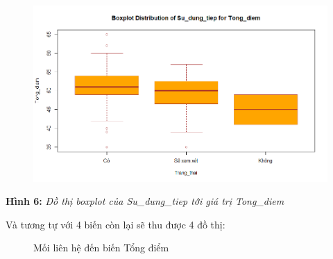 \documentclass[a4paper]{article}
\theoremstyle{definition}
\begin{document}
\begin{itemize}
\begin{itemize}
\begin{enumerate}
\begin{figure}[H]
            \includegraphics[scale=0.35]{a.png}
            \label{fig:my_label}
        \end{figure}
        \begin{center}
            \textbf{Hình 6: }\textit{Đồ thị boxplot của Su\_dung\_tiep tới giá trị Tong\_diem}
        \end{center}
        Và tương tự với 4 biến còn lại sẽ thu được 4 đồ thị:
        \hspace{2cm}
        \begin{figure}
\hfill
{}\hfill
{}\hfill
  \hfill
\caption{Mối liên hệ đến biến Tổng điểm}
\end{figure}


\end{enumerate}
\end{itemize}
\end{itemize}
\end{document}
